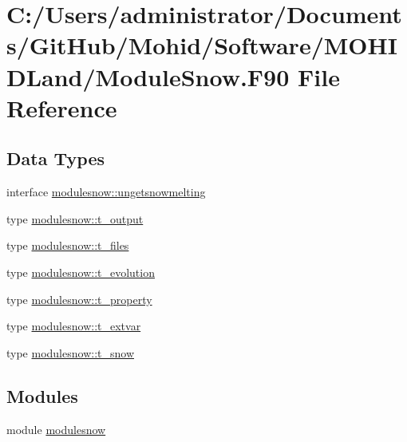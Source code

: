 \hypertarget{_module_snow_8_f90}{}\section{C\+:/\+Users/administrator/\+Documents/\+Git\+Hub/\+Mohid/\+Software/\+M\+O\+H\+I\+D\+Land/\+Module\+Snow.F90 File Reference}
\label{_module_snow_8_f90}
\subsection*{Data Types}
\begin{DoxyCompactItemize}
\item 
interface \mbox{\hyperlink{interfacemodulesnow_1_1ungetsnowmelting}{modulesnow\+::ungetsnowmelting}}
\item 
type \mbox{\hyperlink{structmodulesnow_1_1t__output}{modulesnow\+::t\+\_\+output}}
\item 
type \mbox{\hyperlink{structmodulesnow_1_1t__files}{modulesnow\+::t\+\_\+files}}
\item 
type \mbox{\hyperlink{structmodulesnow_1_1t__evolution}{modulesnow\+::t\+\_\+evolution}}
\item 
type \mbox{\hyperlink{structmodulesnow_1_1t__property}{modulesnow\+::t\+\_\+property}}
\item 
type \mbox{\hyperlink{structmodulesnow_1_1t__extvar}{modulesnow\+::t\+\_\+extvar}}
\item 
type \mbox{\hyperlink{structmodulesnow_1_1t__snow}{modulesnow\+::t\+\_\+snow}}
\end{DoxyCompactItemize}
\subsection*{Modules}
\begin{DoxyCompactItemize}
\item 
module \mbox{\hyperlink{namespacemodulesnow}{modulesnow}}
\end{DoxyCompactItemize}
